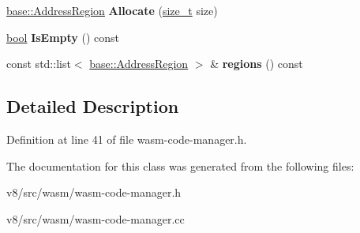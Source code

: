 \begin{DoxyCompactItemize}
\mbox{\hyperlink{classv8_1_1base_1_1AddressRegion}{base\+::\+Address\+Region}} {\bfseries Allocate} (\mbox{\hyperlink{classsize__t}{size\+\_\+t}} size)
\item 
\mbox{\label{classv8_1_1internal_1_1wasm_1_1DisjointAllocationPool_ae1c8c42c6b46181491ce58c3680e04a3}} 
\mbox{\hyperlink{classbool}{bool}} {\bfseries Is\+Empty} () const
\item 
\mbox{\label{classv8_1_1internal_1_1wasm_1_1DisjointAllocationPool_aa76319d5d6413cdb54391572cb07104e}} 
const std\+::list$<$ \mbox{\hyperlink{classv8_1_1base_1_1AddressRegion}{base\+::\+Address\+Region}} $>$ \& {\bfseries regions} () const
\end{DoxyCompactItemize}


\subsection{Detailed Description}


Definition at line 41 of file wasm-\/code-\/manager.\+h.



The documentation for this class was generated from the following files\+:\begin{DoxyCompactItemize}
\item 
v8/src/wasm/wasm-\/code-\/manager.\+h\item 
v8/src/wasm/wasm-\/code-\/manager.\+cc\end{DoxyCompactItemize}
